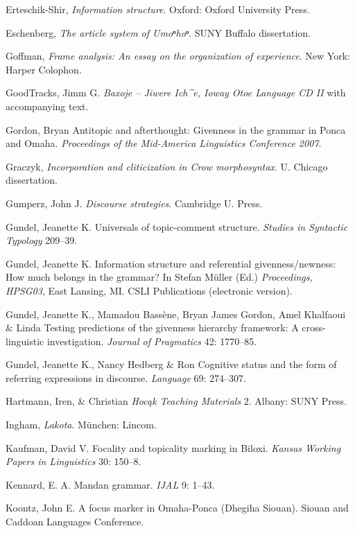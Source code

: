 \documentclass[output=paper]{LSP/langsci}
\begin{document}
\begin{reflist}
Erteschik-Shir, \citet{Nomi2007} \emph{Information structure}. Oxford: Oxford University Press.

Eschenberg, \citet{Ardis2005} \emph{The article system of Umoⁿhoⁿ}. SUNY Buffalo dissertation.

Goffman, \citet{Erving1974} \emph{Frame analysis: An essay on the organization of experience}. New York: Harper Colophon.

GoodTracks, Jimm G.  \emph{Baxoje -- Jiwere Ich\^{}e, Ioway Otoe Language CD II} with accompanying text.

Gordon, Bryan \citet{James2008} Antitopic and afterthought: Givenness in the grammar in Ponca and Omaha. \emph{Proceedings of the Mid-America Linguistics Conference 2007}.

Graczyk, \citet{Randolph1991} \emph{Incorporation and cliticization in Crow morphosyntax}. U. Chicago dissertation.

Gumperz, John J.  \emph{Discourse strategies}. Cambridge U. Press.

Gundel, Jeanette K.  Universals of topic-comment structure. \emph{Studies in Syntactic Typology} 209--39.

Gundel, Jeanette K.  Information structure and referential givenness/newness: How much belongs in the grammar? In Stefan Müller (Ed.) \emph{Proceedings, HPSG03}, East Lansing, MI. CSLI Publications (electronic version).

Gundel, Jeanette K., Mamadou Bassène, Bryan James Gordon, Amel Khalfaoui \& Linda \citet{Humnick2010} Testing predictions of the givenness hierarchy framework: A cross-linguistic investigation. \emph{Journal of Pragmatics} 42: 1770--85.

Gundel, Jeanette K., Nancy Hedberg \& Ron \citet{Zacharski1993} Cognitive status and the form of referring expressions in discourse. \emph{Language} 69: 274--307.

Hartmann, Iren, \& Christian \citet{Marschke2010} \emph{Hocąk Teaching Materials} 2. Albany: SUNY Press.

Ingham, \citet{Bruce2003} \emph{Lakota}. München: Lincom.

Kaufman, David V.  Focality and topicality marking in Biloxi. \emph{Kansas Working Papers in Linguistics} 30: 150--8.

Kennard, E. A.  Mandan grammar. \emph{IJAL} 9: 1--43.

Koontz, John E.  A focus marker in Omaha-Ponca (Dhegiha Siouan). Siouan and Caddoan Languages Conference.


\end{reflist}
\end{document}
